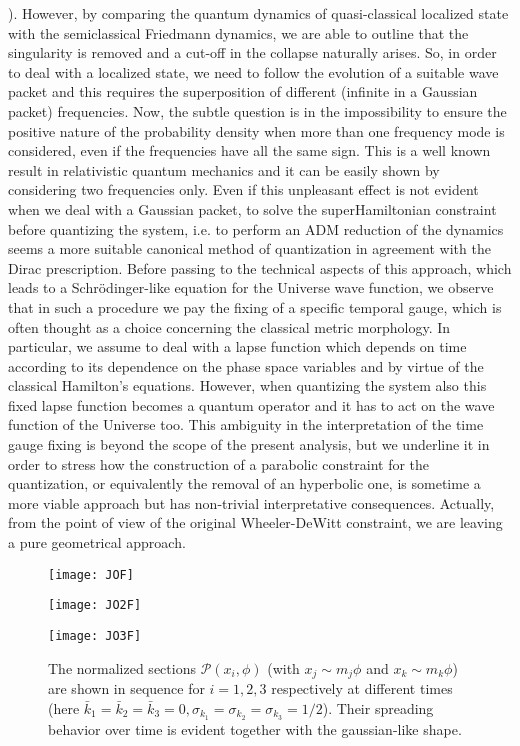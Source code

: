 \documentclass[aps,prd,twocolumn,nofootinbib,superscriptaddress]{revtex4-2}
\begin{document}
\cite{PC,Kolb,1999,2000,2000bis}). However, by comparing the quantum dynamics of quasi-classical localized state with the semiclassical Friedmann dynamics, we are able to outline that the singularity is removed and a cut-off in the collapse naturally arises. So, in order to deal with a localized state, we need to follow the evolution of a suitable wave packet and this requires the superposition of different (infinite in a Gaussian packet) frequencies. Now, the subtle question is in the impossibility to ensure the positive nature of the probability density \cite{rosenstein1985probability} when more than one frequency mode is considered, even if the frequencies have all the same sign. This is a well known result in relativistic quantum mechanics \cite{rosenstein1985probability} and it can be easily shown by considering two frequencies only. Even if this unpleasant effect is not evident when we deal with a Gaussian packet, to solve the superHamiltonian constraint before quantizing the system, i.e. to perform an ADM reduction of the dynamics \cite{ADM,G,PC,CQG} seems a more suitable canonical method of quantization in agreement with the Dirac prescription. Before passing to the technical aspects of this approach, which leads to a Schr\"{o}dinger-like equation for the Universe wave function, we observe that in such a procedure we pay the fixing of a specific temporal gauge, which is often thought as a choice concerning the classical metric morphology. In particular, we assume to deal with a lapse function which depends on time according to its dependence on the phase space variables and by virtue of the classical Hamilton's equations. However, when quantizing the system also this fixed lapse function becomes a quantum operator and it has to act on the wave function of the Universe too. This ambiguity in the interpretation of the time gauge fixing is beyond the scope of the present analysis, but we underline it in order to stress how the construction of a parabolic constraint for the quantization, or equivalently the removal of an hyperbolic one, is sometime a more viable approach but has non-trivial interpretative consequences. Actually, from the point of view of the original Wheeler-DeWitt constraint, we are leaving a pure geometrical approach.
\begin{figure*}
	\begin{minipage}{3.4cm}
		\texttt{[image: JOF]}
	\end{minipage}
	\qquad\qquad\qquad
	\begin{minipage}{3.4cm}
		\texttt{[image: JO2F]}
	\end{minipage}
	\qquad\qquad\qquad
	\begin{minipage}{3.4cm}
		\texttt{[image: JO3F]}
	\end{minipage}
	\qquad\qquad\qquad\quad
	\caption{The normalized sections $\mathcal{P}(x_i,\phi)$ (with $x_j\sim m_j\phi$ and $x_k\sim m_k\phi$) are shown in sequence for $i=1,2,3$ respectively at different times (here $\bar{k}_1=\bar{k}_2=\bar{k}_3=0, \sigma_{k_1}=\sigma_{k_2}=\sigma_{k_3}=1/2$). Their spreading behavior over time is evident together with the gaussian-like shape.}
	\label{qprob}
\end{figure*}
\end{document}
